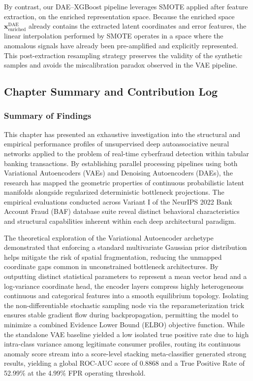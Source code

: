By contrast, our DAE--XGBoost pipeline leverages SMOTE applied after feature extraction, on the enriched representation space. Because the enriched space $\mathbf{x}^{\text{DAE}}_{\text{enriched}}$ already contains the extracted latent coordinates and error features, the linear interpolation performed by SMOTE operates in a space where the anomalous signals have already been pre-amplified and explicitly represented. This post-extraction resampling strategy preserves the validity of the synthetic samples and avoids the miscalibration paradox observed in the VAE pipeline.

\subsection{Chapter Summary and Contribution Log}

\subsubsection{Summary of Findings}

This chapter has presented an exhaustive investigation into the structural and empirical performance profiles of unsupervised deep autoassociative neural networks applied to the problem of real-time cyberfraud detection within tabular banking transactions. By establishing parallel processing pipelines using both Variational Autoencoders (VAEs) and Denoising Autoencoders (DAEs), the research has mapped the geometric properties of continuous probabilistic latent manifolds alongside regularized deterministic bottleneck projections. The empirical evaluations conducted across Variant I of the NeurIPS 2022 Bank Account Fraud (BAF) database suite reveal distinct behavioral characteristics and structural capabilities inherent within each deep architectural paradigm.

The theoretical exploration of the Variational Autoencoder archetype demonstrated that enforcing a standard multivariate Gaussian prior distribution helps mitigate the risk of spatial fragmentation, reducing the unmapped coordinate gaps common in unconstrained bottleneck architectures. By outputting distinct statistical parameters to represent a mean vector head and a log-variance coordinate head, the encoder layers compress highly heterogeneous continuous and categorical features into a smooth equilibrium topology. Isolating the non-differentiable stochastic sampling node via the reparameterization trick ensures stable gradient flow during backpropagation, permitting the model to minimize a combined Evidence Lower Bound (ELBO) objective function. While the standalone VAE baseline yielded a low isolated true positive rate due to high intra-class variance among legitimate consumer profiles, routing its continuous anomaly score stream into a score-level stacking meta-classifier generated strong results, yielding a global ROC-AUC score of 0.8868 and a True Positive Rate of 52.99\% at the 4.99\% FPR operating threshold.

